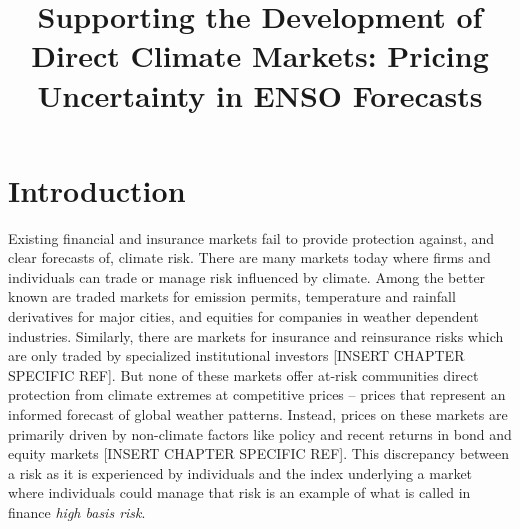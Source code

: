 \documentclass[authoryear]{article}
\begin{document}
\title{Supporting the Development of Direct Climate Markets: Pricing Uncertainty in ENSO Forecasts}
\date{}  %
%
%
%
%
%


\maketitle%


\section{Introduction}
Existing financial and insurance markets fail to provide protection against, and clear forecasts of, climate risk. There are many markets today where firms and individuals can trade or manage risk influenced by climate. Among the better known are traded markets for emission permits, temperature and rainfall derivatives for major cities, and equities for companies in weather dependent industries. Similarly, there are markets for insurance and reinsurance risks which are only traded by specialized institutional investors \citep{kurtov2010investing}[INSERT CHAPTER SPECIFIC REF]. But none of these markets offer at-risk communities direct protection from climate extremes at competitive prices – prices that represent an informed forecast of global weather patterns. Instead, prices on these markets are primarily driven by non-climate factors like policy and recent returns in bond and equity markets \citep{econ2013ETS} \citep{kurtov2010investing}[INSERT CHAPTER SPECIFIC REF]. This discrepancy between a risk as it is  experienced by individuals and the index underlying a market where individuals could manage that risk is an example of what is called in finance \emph{high basis risk}.
\end{document}
